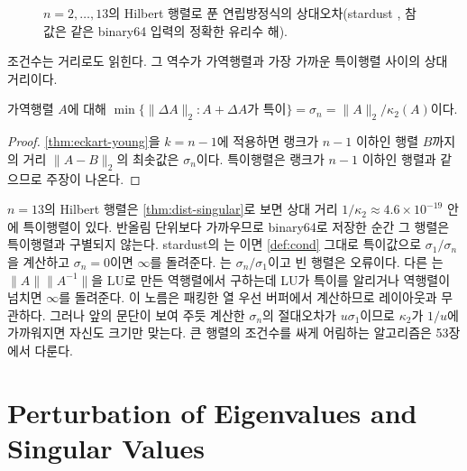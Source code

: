 \begin{figure}[htbp]
\centering
{}
\caption{$n=2,\dots,13$의 Hilbert 행렬로 푼 연립방정식의 상대오차(stardust , 참값은 같은 binary64 입력의 정확한 유리수 해).}
\label{fig:hilbert}
\end{figure}

조건수는 거리로도 읽힌다. 그 역수가 가역행렬과 가장 가까운 특이행렬 사이의 상대 거리이다.

\begin{theorem}
\label{thm:dist-singular}
가역행렬 $A$에 대해 $\min\{\|\Delta A\|_2:A+\Delta A\text{가 특이}\}=\sigma_n=\|A\|_2/\kappa_2(A)$이다.
\end{theorem}

\begin{proof}
\cref{thm:eckart-young}을 $k=n-1$에 적용하면 랭크가 $n-1$ 이하인 행렬 $B$까지의 거리 $\|A-B\|_2$의 최솟값은 $\sigma_n$이다. 특이행렬은 랭크가 $n-1$ 이하인 행렬과 같으므로 주장이 나온다.
\end{proof}

$n=13$의 Hilbert 행렬은 \cref{thm:dist-singular}로 보면 상대 거리 $1/\kappa_2\approx4.6\times10^{-19}$ 안에 특이행렬이 있다. 반올림 단위보다 가까우므로 binary64로 저장한 순간 그 행렬은 특이행렬과 구별되지 않는다. stardust의 는 이면 \cref{def:cond} 그대로 특이값으로 $\sigma_1/\sigma_n$을 계산하고 $\sigma_n=0$이면 $\infty$를 돌려준다. 는 $\sigma_n/\sigma_1$이고 빈 행렬은 오류이다. 다른 는 $\|A\|\|A^{-1}\|$을 LU로 만든 역행렬에서 구하는데 LU가 특이를 알리거나 역행렬이 넘치면 $\infty$를 돌려준다. 이 노름은 패킹한 열 우선 버퍼에서 계산하므로 레이아웃과 무관하다. 그러나 앞의 문단이 보여 주듯 계산한 $\sigma_n$의 절대오차가 $u\sigma_1$이므로 $\kappa_2$가 $1/u$에 가까워지면  자신도 크기만 맞는다. 큰 행렬의 조건수를 싸게 어림하는 알고리즘은 53장에서 다룬다.

\section{Perturbation of Eigenvalues and Singular Values}
\label{sec:perturbation}

